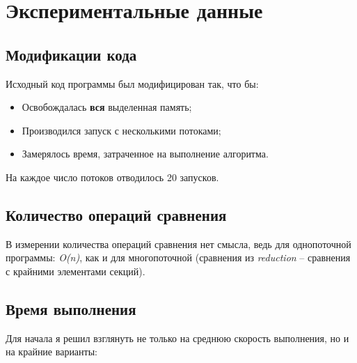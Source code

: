 \pgfplotsset{width=10cm, compat=1.18}

\section{Экспериментальные данные}

\subsection{Модификации кода}

Исходный код программы был модифицирован так, что бы:
\begin{itemize}
    \item Освобождалась \textbf{вся} выделенная память;
    \item Производился запуск с несколькими потоками;
    \item Замерялось время, затраченное на выполнение алгоритма.
\end{itemize}

На каждое число потоков отводилось 20 запусков.

\subsection{Количество операций сравнения}

В измерении количества операций сравнения нет смысла, ведь для однопоточной программы:
\textit{O(n)}, как и для многопоточной (сравнения из \textit{reduction} -- сравнения с крайними элементами секций).

\subsection{Время выполнения}

Для начала я решил взглянуть не только на среднюю скорость выполнения, но и на крайние варианты:

\vspace{0.5cm}


